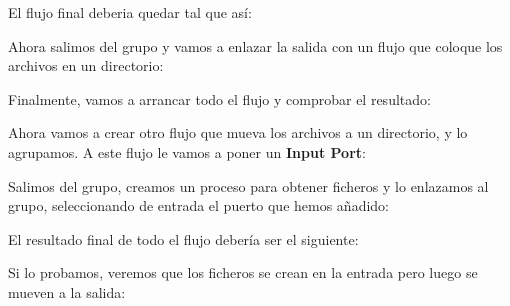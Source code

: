 \documentclass{../../miPlantilla}
\begin{document}
El flujo final deberia quedar tal que así:


Ahora salimos del grupo y vamos a enlazar la salida con un flujo que coloque los archivos en un directorio:


Finalmente, vamos a arrancar todo el flujo y comprobar el resultado:


\newpage

Ahora vamos a crear otro flujo que mueva los archivos a un directorio, y lo agrupamos. A este flujo le vamos a poner un
\textbf{Input Port}:


Salimos del grupo, creamos un proceso para obtener ficheros y lo enlazamos al grupo, seleccionando de entrada el puerto que hemos
añadido:


El resultado final de todo el flujo debería ser el siguiente:


\newpage

Si lo probamos, veremos que los ficheros se crean en la entrada pero luego se mueven a la salida:

\end{document}
